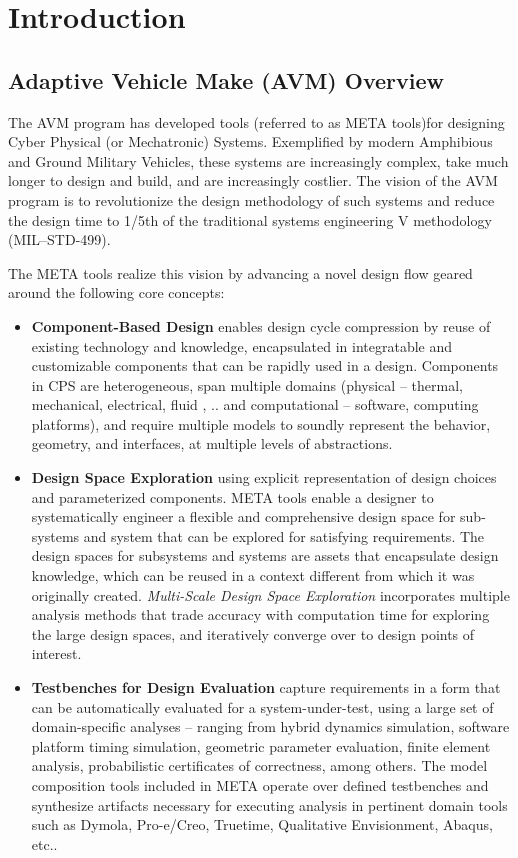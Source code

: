 \chapter{Introduction}

\section{Adaptive Vehicle Make (AVM) Overview}
The AVM program has developed tools (referred to as META tools)for designing Cyber Physical (or Mechatronic) Systems. Exemplified by modern Amphibious and Ground Military Vehicles, these systems are increasingly complex, take much longer to design and build, and are increasingly costlier. The vision of the AVM program is to revolutionize the design methodology of such systems and reduce the design time to 1/5th of the traditional systems engineering V methodology (MIL–STD-499). 

The META tools realize this vision by advancing a novel design flow geared around the following core concepts:

\begin{itemize}
\item \textbf{Component-Based Design} enables design cycle compression by reuse of existing technology and knowledge, encapsulated in integratable and customizable components that can be rapidly used in a design. Components in CPS are heterogeneous, span multiple domains (physical – thermal, mechanical, electrical, fluid , .. and computational – software,  computing platforms), and require multiple models to soundly represent the behavior, geometry, and interfaces, at multiple levels of abstractions. 
 
\item \textbf{Design Space Exploration} using explicit representation of design choices and parameterized components. META tools enable a designer to systematically engineer a flexible and comprehensive design space for sub-systems and system that can be explored for satisfying requirements. The design spaces for subsystems and systems are assets that encapsulate design knowledge, which can be reused in a context different from which it was originally created. \textit{Multi-Scale Design Space Exploration} incorporates multiple analysis methods that trade accuracy with computation time for exploring the large design spaces, and iteratively converge over to design points of interest.

\item \textbf{Testbenches for Design Evaluation} capture requirements in a form that can be automatically evaluated for a system-under-test, using a large set of domain-specific analyses – ranging from hybrid dynamics simulation, software platform timing simulation, geometric parameter evaluation, finite element analysis, probabilistic certificates of correctness, among others. The model composition tools included in META operate over defined testbenches and synthesize artifacts necessary for executing analysis in pertinent domain tools such as Dymola, Pro-e/Creo, Truetime, Qualitative Envisionment, Abaqus, etc.. 
\end{itemize}

